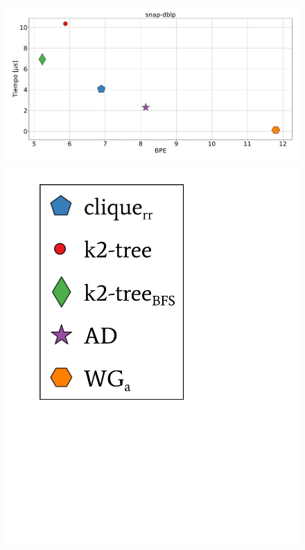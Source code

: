 \begin{figure}
    	\centering
    	\begin{minipage}{1\textwidth}
    			\centering
    			\begin{minipage}{0.8\textwidth}
    				\centering
    				\includegraphics[width=1\linewidth]{img/bpeTimes/aleatorio/snap-dblp.pdf}
    			\end{minipage}
    			\begin{minipage}{0.15\textwidth}
    				\centering
    				\includegraphics[scale=.24, clip, trim=70 300 230 30]{img/bpeTimes/labelAle.pdf}
    			\end{minipage}
    			

\end{minipage}
\end{figure}
